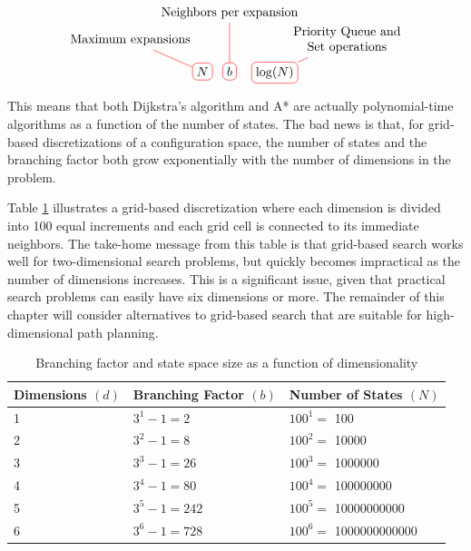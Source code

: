 \begin{equation*}
\tikz[baseline]{
    \node[draw=red,rounded corners,anchor=base] at (0, 0) (m1)
    {$N$};
    \node[] at (-2, 1) (l1) {Maximum expansions};
    \draw[-,red] (l1) -- (m1);

    \node[draw=red,rounded corners,anchor=base] at (.75,0)  (m2)
    {$b$};
    \node[] at (.75, 1.75) (l2) {Neighbors per expansion};
    \draw[-,red] (l2) -- (m2);
    
    \node[draw=red,rounded corners,anchor=base] (m3) at (2,0)
         {$\log(N)$};
    \node[text width=3cm,align=center] at (4, 1) (l3) {Priority Queue and\\Set operations};
    \draw[-,red] (l3) -- (m3);
    }
\end{equation*}

This means that both Dijkstra's algorithm and A* are actually
polynomial-time algorithms as a function of the number of states.  The
bad news is that, for grid-based discretizations of a configuration
space, the number of states and the branching factor both grow
exponentially with the number of dimensions in the problem.

Table \ref{table:grid_growth} illustrates a grid-based discretization
where each dimension is divided into 100 equal increments and each
grid cell is connected to its immediate neighbors.  The take-home
message from this table is that grid-based search
works well for two-dimensional search problems, but quickly becomes
impractical as the number of dimensions increases.  This is a
significant issue, given that practical search problems can easily
have six dimensions or more. The remainder of this chapter will
consider alternatives to grid-based search that are suitable for
high-dimensional path planning.

  \begin{table}
\begin{center}
\def\arraystretch{1.5}%
\begin{tabular}{|l|l|l|}
  \hline
  Dimensions $(d)$ & Branching Factor $(b)$ & Number of States $(N)$ \\
  \hline

  1 & $3^1 - 1 = 2$ & $100^1 =$ \num[group-separator={,}]{100}\\
  \hline
  2 & $3^2 - 1 = 8$ & $100^2 =$ \num[group-separator={,}]{10000}\\
  \hline
  3 & $3^3 - 1 = 26$ & $100^3 =$ \num[group-separator={,}]{1000000}\\
  \hline
  4 & $3^4 - 1 = 80$ & $100^4 =$ \num[group-separator={,}]{100000000}\\
  \hline
  5 & $3^5 - 1 = 242$ & $100^5 =$ \num[group-separator={,}]{10000000000}\\
  \hline
  6 & $3^6 - 1 = 728$ & $100^6 =$ \num[group-separator={,}]{1000000000000}\\
  \hline
\end{tabular}
\end{center}
\caption{Branching factor and state space size as a function of dimensionality}
\label{table:grid_growth}
\end{table}




